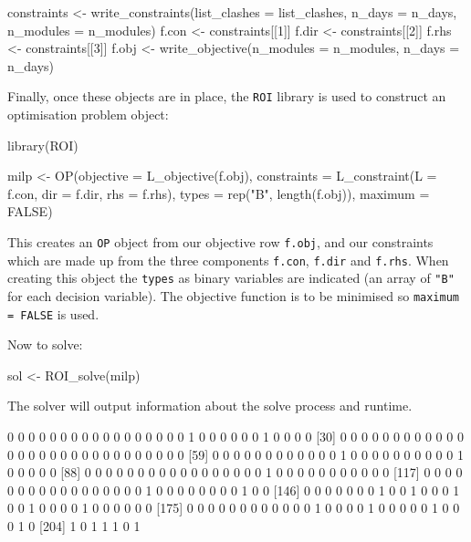\begin{Rin-no-test}
constraints <- write_constraints(list_clashes = list_clashes,
                                 n_days = n_days,
                                 n_modules = n_modules)
f.con <- constraints[[1]]
f.dir <- constraints[[2]]
f.rhs <- constraints[[3]]
f.obj <- write_objective(n_modules = n_modules, n_days = n_days)
\end{Rin-no-test}

Finally, once these objects are in place, the
\texttt{ROI} library is used to construct an optimisation problem object:

\begin{Rin-no-test}
library(ROI)

milp <- OP(objective = L_objective(f.obj),
           constraints = L_constraint(L = f.con,
                                      dir = f.dir,
                                      rhs = f.rhs),
           types = rep("B", length(f.obj)),
           maximum = FALSE)
\end{Rin-no-test}

This creates an \texttt{OP} object from our objective row
\texttt{f.obj}, and our constraints which are made up from the three
components \texttt{f.con}, \texttt{f.dir} and
\texttt{f.rhs}.
When creating this object the \texttt{types} as binary
variables are indicated (an array of \texttt{"B"} for each decision
variable).
The objective function is to be minimised so
\texttt{maximum = FALSE} is used.

Now to solve:

\begin{Rin-no-test}
sol <- ROI_solve(milp)
\end{Rin-no-test}

The solver will output information about the solve process and runtime.


\begin{Rout-no-test}
  [1] 0 0 0 0 0 0 0 0 0 0 0 0 0 0 0 0 0 1 0 0 0 0 0 0 1 0 0 0 0
 [30] 0 0 0 0 0 0 0 0 0 0 0 0 0 0 0 0 0 0 0 0 0 0 0 0 0 0 0 0 0
 [59] 0 0 0 0 0 0 0 0 0 0 0 0 1 0 0 0 0 0 0 0 0 0 0 1 0 0 0 0 0
 [88] 0 0 0 0 0 0 0 0 0 0 0 0 0 0 0 0 0 1 0 0 0 0 0 0 0 0 0 0 0
[117] 0 0 0 0 0 0 0 0 0 0 0 0 0 0 0 0 0 1 0 0 0 0 0 0 0 0 1 0 0
[146] 0 0 0 0 0 0 0 1 0 0 1 0 0 0 1 0 0 1 0 0 0 0 1 0 0 0 0 0 0
[175] 0 0 0 0 0 0 0 0 0 0 0 0 1 0 0 0 0 1 0 0 0 0 0 1 0 0 0 1 0
[204] 1 0 1 1 1 0 1
\end{Rout-no-test}

